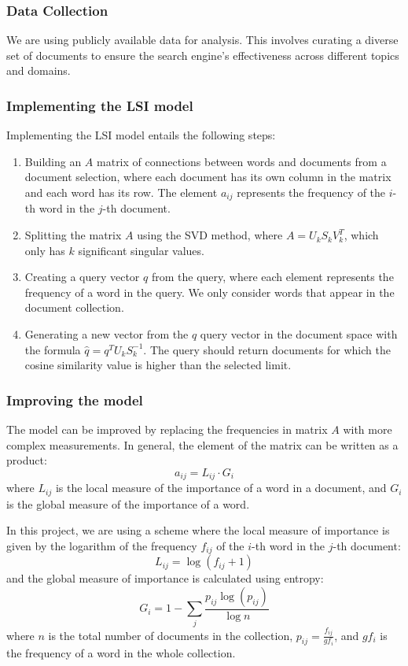 \documentclass[12pt,a4paper]{article}
\begin{document}
\subsubsection{Data Collection}

We are using publicly available data for analysis. This involves curating a diverse set of documents to ensure the search engine's effectiveness across different topics and domains.


\subsubsection{Implementing the LSI model}

Implementing the LSI model entails the following steps:

\begin{enumerate}
    \item Building an $A$ matrix of connections between words and documents from a document selection, where each document has its own column in the matrix and each word has its row. The element $a_{ij}$ represents the frequency of the $i$-th word in the $j$-th document.
    \item Splitting the matrix $A$ using the SVD method, where $A = U_k  S_k  V_k^T$, which only has $k$ significant singular values.
    \item Creating a query vector $q$ from the query, where each element represents the frequency of a word in the query. We only consider words that appear in the document collection.
    \item Generating a new vector from the $q$ query vector in the document space with the formula $\hat{q} = q^T U_k S_k^{-1}$. The query should return documents for which the cosine similarity value is higher than the selected limit.
\end{enumerate}

\subsubsection{Improving the model}

The model can be improved by replacing the frequencies in matrix $A$ with more complex measurements. In general, the element of the matrix can be written as a product:
\[ a_{ij} = L_{ij} \cdot G_i \]
where $L_{ij}$ is the local measure of the importance of a word in a document, and $G_i$ is the global measure of the importance of a word.

\bigskip
\noindent In this project, we are using a scheme where the local measure of importance is given by the logarithm of the frequency $f_{ij}$ of the $i$-th word in the $j$-th document:
\[ L_{ij} = \log (f_{ij} +1) \]
and the global measure of importance is calculated using entropy:
\[ G_i = 1 - \sum_{j} \frac{p_{ij} \log (p_{ij})}{\log n} \]
where $n$ is the total number of documents in the collection, $p_{ij} = \frac{f_ {ij}}{g f_i}$, and $gf_i$ is the frequency of a word in the whole collection.
\end{document}
